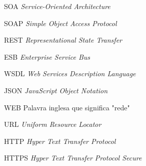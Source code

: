 \begin{siglas}
  \item[SOA] \textit{Service-Oriented Architecture}
  \item[SOAP] \textit{Simple Object Access Protocol}
  \item[REST] \textit{Representational State Transfer}
  \item[ESB] \textit{Enterprise Service Bus}
  \item[WSDL] \textit{Web Services Description Language}
  \item[JSON] \textit{JavaScript Object Notation}
  \item[WEB] Palavra inglesa que significa "rede"
  \item[URL] \textit{Uniform Resource Locator}
  \item[HTTP] \textit{Hyper Text Transfer Protocol}
  \item[HTTPS] \textit{Hyper Text Transfer Protocol Secure}
\end{siglas}

